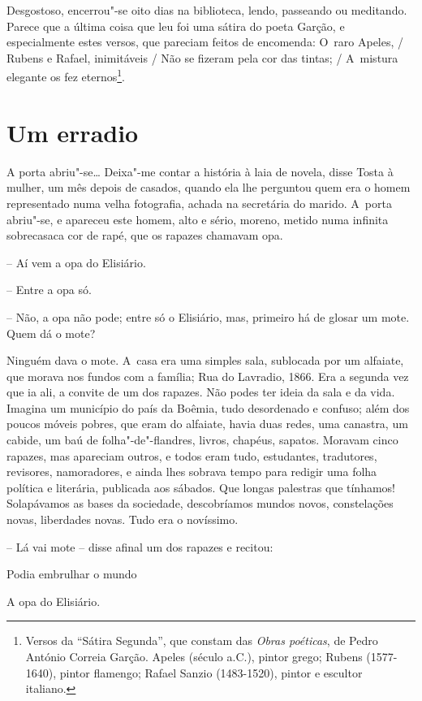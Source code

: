 Desgostoso, encerrou"-se oito dias na biblioteca, lendo, passeando ou
meditando. Parece que a última coisa que leu foi uma sátira do poeta
Garção, e especialmente estes versos, que pareciam feitos de encomenda:
O~raro Apeles, / Rubens e Rafael, inimitáveis / Não se fizeram pela cor
das tintas; / A~mistura elegante os fez eternos\footnote{Versos da
  ``Sátira Segunda'', que constam das \emph{Obras poéticas}, de Pedro
  António Correia Garção. Apeles (século  a.C.), pintor grego; Rubens
  (1577-1640), pintor flamengo; Rafael Sanzio (1483-1520), pintor e
  escultor italiano.}.

\chapter{Um erradio}

A porta abriu"-se\ldots{} Deixa"-me contar a história à laia de novela, disse
Tosta à mulher, um mês depois de casados, quando ela lhe perguntou quem
era o homem representado numa velha fotografia, achada na secretária do
marido. A~porta abriu"-se, e apareceu este homem, alto e sério, moreno,
metido numa infinita sobrecasaca cor de rapé, que os rapazes chamavam
opa.

-- Aí vem a opa do Elisiário.

-- Entre a opa só.

-- Não, a opa não pode; entre só o Elisiário, mas, primeiro há de glosar
um mote. Quem dá o mote?

Ninguém dava o mote. A~casa era uma simples sala, sublocada por um
alfaiate, que morava nos fundos com a família; Rua do Lavradio, 1866.
Era a segunda vez que ia ali, a convite de um dos rapazes. Não podes ter
ideia da sala e da vida. Imagina um município do país da Boêmia, tudo
desordenado e confuso; além dos poucos móveis pobres, que eram do
alfaiate, havia duas redes, uma canastra, um cabide, um baú de
folha"-de"-flandres, livros, chapéus, sapatos. Moravam cinco rapazes, mas
apareciam outros, e todos eram tudo, estudantes, tradutores, revisores,
namoradores, e ainda lhes sobrava tempo para redigir uma folha política
e literária, publicada aos sábados. Que longas palestras que tínhamos!
Solapávamos as bases da sociedade, descobríamos mundos novos,
constelações novas, liberdades novas. Tudo era o novíssimo.

-- Lá vai mote -- disse afinal um dos rapazes e recitou:

Podia embrulhar o mundo

A opa do Elisiário.

